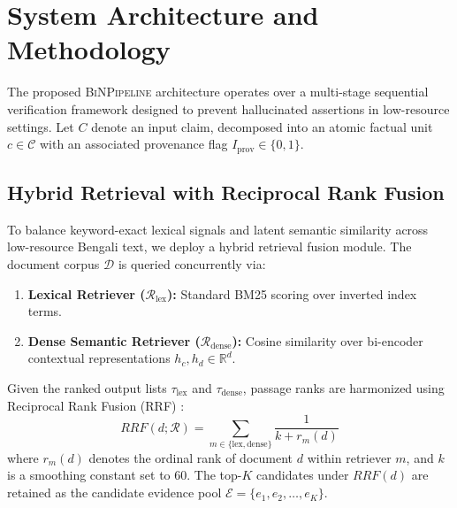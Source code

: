 \documentclass[11pt,a4paper]{article}
\begin{document}
\section{System Architecture and Methodology}
\label{sec:methodology}
The proposed \textsc{BiNPipeline} architecture operates over a multi-stage sequential verification framework designed to prevent hallucinated assertions in low-resource settings. Let $C$ denote an input claim, decomposed into an atomic factual unit $c \in \mathcal{C}$ with an associated provenance flag $I_{\text{prov}} \in \{0, 1\}$.

\subsection{Hybrid Retrieval with Reciprocal Rank Fusion}
To balance keyword-exact lexical signals and latent semantic similarity across low-resource Bengali text, we deploy a hybrid retrieval fusion module. The document corpus $\mathcal{D}$ is queried concurrently via:
\begin{enumerate}
    \item \textbf{Lexical Retriever ($\mathcal{R}_{\text{lex}}$):} Standard BM25 scoring over inverted index terms.
    \item \textbf{Dense Semantic Retriever ($\mathcal{R}_{\text{dense}}$):} Cosine similarity over bi-encoder contextual representations $h_c, h_d \in \mathbb{R}^d$.
\end{enumerate}
Given the ranked output lists $\tau_{\text{lex}}$ and $\tau_{\text{dense}}$, passage ranks are harmonized using Reciprocal Rank Fusion (RRF) \cite{cormack2009reciprocal}:
\begin{equation}
RRF(d; \mathcal{R}) = \sum_{m \in \{\text{lex}, \text{dense}\}} \frac{1}{k + r_m(d)}
\end{equation}
where $r_m(d)$ denotes the ordinal rank of document $d$ within retriever $m$, and $k$ is a smoothing constant set to 60. The top-$K$ candidates under $RRF(d)$ are retained as the candidate evidence pool $\mathcal{E} = \{e_1, e_2, \dots, e_K\}$.
\end{document}
